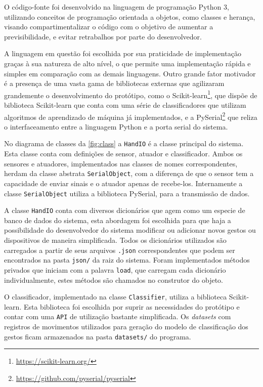 O código-fonte foi desenvolvido na linguagem de programação Python $3$, utilizando conceitos de programação orientada a objetos, como classes e herança, visando compartimentalizar o código com o objetivo de aumentar a previsibilidade, e evitar retrabalhos por parte do desenvolvedor. 

A linguagem em questão foi escolhida por sua praticidade de implementação graças à sua natureza de alto nível, o que permite uma implementação rápida e simples em comparação com as demais linguagens. Outro grande fator motivador é a presença de uma vasta gama de bibliotecas externas que agilizaram grandemente o desenvolvimento do protótipo, como o Scikit-learn\footnote{\url{https://scikit-learn.org/}\label{ftnote:sklearn}}, que dispõe de biblioteca Scikit-learn que conta com uma série de classificadores que utilizam algoritmos de aprendizado de máquina já implementados, e a PySerial\footnote{\url{https://github.com/pyserial/pyserial}\label{ftnote:pyserial}} que reliza o interfaceamento entre a linguagem Python e a porta serial do sistema.

No diagrama de classes da \autoref{fig:class} a \texttt{HandIO} é a classe principal do sistema. Esta classe conta com definições de sensor, atuador e classificador. Ambos os sensores e atuadores, implementados nas classes de nomes correspondentes, herdam da classe abstrata \texttt{SerialObject}, com a diferença de que o sensor tem a capacidade de enviar sinais e o atuador apenas de recebe-los. Internamente a classe \texttt{SerialObject} utiliza a biblioteca PySerial, para a transmissão de dados. 

A classe \texttt{HandIO} conta com diversos dicionários que agem como um especie de banco de dados do sistema, esta abordagem foi escolhida para que haja a possibilidade do desenvolvedor do sistema modificar ou adicionar novos gestos ou dispositivos de maneira simplificada. Todos os dicionários utilizados são carregados a partir de seus arquivos \texttt{.json} correspondentes que podem ser encontrados na pasta \texttt{json/} da raiz do sistema. Foram implementados métodos privados que iniciam com a palavra \texttt{load}, que carregam cada dicionário individualmente, estes métodos são chamados no construtor do objeto.

O classificador, implementado na classe \texttt{Classifier}, utiliza a biblioteca Scikit-learn. Esta biblioteca foi escolhida por suprir as necessidades do protótipo e contar com uma \texttt{API} de utilização bastante simplificada. Os \textit{datasets} com registros de movimentos utilizados para geração do modelo de classificação dos gestos ficam armazenados na pasta \texttt{datasets/} do programa. 

